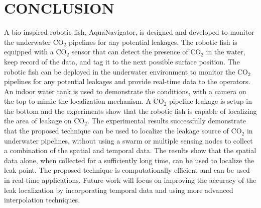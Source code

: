 \documentclass[12pt, draftclsnofoot, onecolumn]{IEEEtran}
\begin{document}
\section{CONCLUSION}
A bio-inspired robotic fish, AquaNavigator, is designed and developed to monitor the underwater CO$_2$ pipelines for any potential leakages. The robotic fish is equipped with a CO$_2$ sensor that can detect the presence of CO$_2$ in the water, keep record of the data, and tag it to the next possible surface position. The robotic fish can be deployed in the underwater environment to monitor the CO$_2$ pipelines for any potential leakages and provide real-time data to the operators. An indoor water tank is used to demonstrate the conditions, with a camera on the top to mimic the localization mechanism. A CO$_2$ pipeline leakage is setup in the bottom and the experiments show that the robotic fish is capable of localizing the area of leakage on CO$_2$. The experimental results successfully demonstrate that the proposed technique can be used to localize the leakage source of CO$_2$ in underwater pipelines, without using a swarm or multiple sensing  nodes to collect a combination of the spatial and temporal data. The results show that the spatial data alone, when collected for a sufficiently long time, can be used to localize the leak point. The proposed technique is computationally efficient and can be used in real-time applications. Future work will focus on improving the accuracy of the leak localization by incorporating temporal data and using more advanced interpolation techniques.


\end{document}
